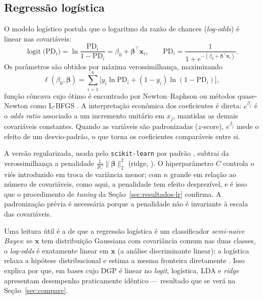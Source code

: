 \documentclass[11pt,a4paper]{article}
\newcommand{\pd}{\mathrm{PD}}
\newcommand{\code}[1]{\texttt{#1}}
\begin{document}
\subsection{Regressão logística}
\label{sec:lr}

O modelo logístico postula que o logaritmo da razão de chances (\emph{log-odds}) é linear nas covariáveis:
\begin{equation}
\operatorname{logit}\big(\pd_i\big) = \ln \frac{\pd_i}{1-\pd_i} = \beta_0 + \boldsymbol{\beta}^{\top}\mathbf{x}_i,
\qquad
\pd_i = \frac{1}{1+e^{-(\beta_0 + \boldsymbol{\beta}^{\top}\mathbf{x}_i)}} .
\label{eq:logit}
\end{equation}
Os parâmetros são obtidos por máxima verossimilhança, maximizando
\begin{equation}
\ell(\beta_0,\boldsymbol{\beta}) = \sum_{i=1}^{n}\Big[y_i \ln \pd_i + (1-y_i)\ln(1-\pd_i)\Big],
\end{equation}
função côncava cujo ótimo é encontrado por Newton--Raphson ou métodos quase-Newton como L-BFGS \citep{hosmer2013,hastie2009}. A interpretação econômica dos coeficientes é direta: $e^{\beta_j}$ é o \emph{odds ratio} associado a um incremento unitário em $x_j$, mantidas as demais covariáveis constantes. Quando as variáveis são padronizadas ($z$-score), $e^{\beta_j}$ mede o efeito de um desvio-padrão, o que torna os coeficientes comparáveis entre si.

A versão regularizada, usada pelo \code{scikit-learn} por padrão \citep{sklearn}, subtrai da verossimilhança a penalidade $\frac{1}{2C}\lVert \boldsymbol{\beta}\rVert_2^2$ (ridge, \citealp{hoerl1970}). O hiperparâmetro $C$ controla o viés introduzido em troca de variância menor; com $n$ grande em relação ao número de covariáveis, como aqui, a penalidade tem efeito desprezível, e é isso que o procedimento de \emph{tuning} da Seção~\ref{sec:resultados-lr} confirma. A padronização prévia é necessária porque a penalidade não é invariante à escala das covariáveis.

Uma leitura útil é a de que a regressão logística é um classificador \emph{semi-naive Bayes}: se $\mathbf{x}$ tem distribuição Gaussiana com covariância comum nas duas classes, o \emph{log-odds} é exatamente linear em $\mathbf{x}$ (a análise discriminante linear); a logística relaxa a hipótese distribucional e estima a mesma fronteira diretamente \citep{hastie2009}. Isso explica por que, em bases cujo DGP é linear no \emph{logit}, logística, LDA e \emph{ridge} apresentam desempenho praticamente idêntico --- resultado que se verá na Seção~\ref{sec:compare}.
\end{document}
